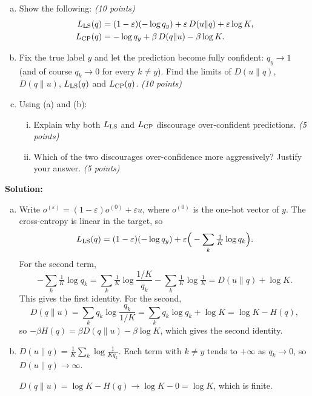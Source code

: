 \documentclass[12pt]{article}
\begin{document}
\begin{enumerate}
\begin{enumerate}[(a)]
\item Show the following: {\it (10 points)}
\begin{align*}
L_{\rm LS}(q)&=(1-\varepsilon)(-\log q_y)+\varepsilon\,D(u\|q)+\varepsilon\log K,\\
L_{\rm CP}(q)&=-\log q_y+\beta\,D(q\|u)-\beta\log K.
\end{align*}

\item Fix the true label $y$ and let the prediction become fully confident: $q_y\to 1$ (and of course $q_k\to 0$ for every $k\ne y$). Find the limits of $D(u\|q)$, $D(q\|u)$, $L_{\rm LS}(q)$ and $L_{\rm CP}(q)$. {\it (10 points)}

\item Using (a) and (b):
\begin{enumerate}[i)]
\item Explain why both $L_{\rm LS}$ and $L_{\rm CP}$ discourage over-confident predictions. {\it (5 points)}
\item Which of the two discourages over-confidence more aggressively? Justify your answer. {\it (5 points)}
\end{enumerate}
\end{enumerate}

\begin{solution}
\vskip 0.2in
{\bf Solution:}

\begin{enumerate}[(a)]

\item Write $o^{(\varepsilon)}=(1-\varepsilon)o^{(0)}+\varepsilon u$, where $o^{(0)}$ is the one-hot vector of $y$. The cross-entropy is linear in the target, so
\[
L_{\rm LS}(q)=(1-\varepsilon)(-\log q_y)+\varepsilon\Big(-\sum_k\tfrac1K\log q_k\Big).
\]
For the second term,
\[
-\sum_k\tfrac1K\log q_k=\sum_k\tfrac1K\log\frac{1/K}{q_k}-\sum_k\tfrac1K\log\tfrac1K=D(u\|q)+\log K.
\]
This gives the first identity. For the second,
\[
D(q\|u)=\sum_k q_k\log\frac{q_k}{1/K}=\sum_k q_k\log q_k+\log K=\log K-H(q),
\]
so $-\beta H(q)=\beta D(q\|u)-\beta\log K$, which gives the second identity.

\item $D(u\|q)=\frac1K\sum_k\log\frac{1}{Kq_k}$. Each term with $k\ne y$ tends to $+\infty$ as $q_k\to 0$, so $D(u\|q)\to\infty$.

$D(q\|u)=\log K-H(q)\to\log K-0=\log K$, which is finite.


\end{enumerate}
\end{solution}
\end{enumerate}
\end{document}
